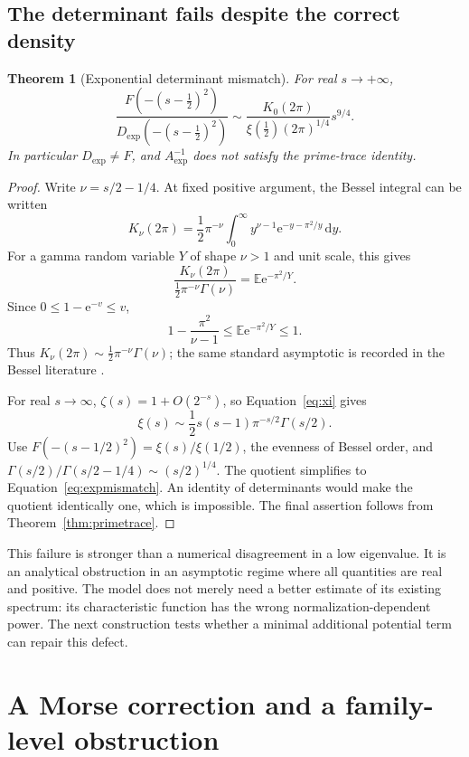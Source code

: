 \documentclass[11pt,letterpaper]{article}
\numberwithin{equation}{section}
\newtheorem{theorem}{Theorem}[section]
\theoremstyle{definition}
\theoremstyle{remark}
\newcommand{\dd}{\,\mathrm d}
\newcommand{\e}{\mathrm e}
\begin{document}
\subsection{The determinant fails despite the correct density}
\begin{theorem}[Exponential determinant mismatch]
\label{thm:expmismatch}
For real $s\to+\infty$,
\begin{equation}
 \frac{F(-(s-\tfrac12)^2)}{D_{\mathrm{exp}}(-(s-\tfrac12)^2)}
 \sim\frac{K_0(2\pi)}{\xi(\tfrac12)(2\pi)^{1/4}}s^{9/4}.
 \label{eq:expmismatch}
\end{equation}
In particular $D_{\mathrm{exp}}\neq F$, and $A_{\mathrm{exp}}^{-1}$ does not satisfy the prime-trace identity.
\end{theorem}
\begin{proof}
Write $\nu=s/2-1/4$. At fixed positive argument, the Bessel integral can be written
\[
 K_\nu(2\pi)=\frac12\pi^{-\nu}
 \int_0^\infty y^{\nu-1}\e^{-y-\pi^2/y}\dd y.
\]
For a gamma random variable $Y$ of shape $\nu>1$ and unit scale, this gives
\[
 \frac{K_\nu(2\pi)}{\frac12\pi^{-\nu}\Gamma(\nu)}
 =\mathbb E\e^{-\pi^2/Y}.
\]
Since $0\leq1-\e^{-v}\leq v$,
\begin{equation}
 1-\frac{\pi^2}{\nu-1}
 \leq\mathbb E\e^{-\pi^2/Y}\leq1.
 \label{eq:besselbound}
\end{equation}
Thus $K_\nu(2\pi)\sim\frac12\pi^{-\nu}\Gamma(\nu)$; the same standard asymptotic is recorded in the Bessel literature \cite{dlmf}.

For real $s\to\infty$, $\zeta(s)=1+O(2^{-s})$, so Equation~\eqref{eq:xi} gives
\[
 \xi(s)\sim\frac12s(s-1)\pi^{-s/2}\Gamma(s/2).
\]
Use $F(-(s-1/2)^2)=\xi(s)/\xi(1/2)$, the evenness of Bessel order, and
$\Gamma(s/2)/\Gamma(s/2-1/4)\sim(s/2)^{1/4}$. The quotient simplifies to Equation~\eqref{eq:expmismatch}. An identity of determinants would make the quotient identically one, which is impossible. The final assertion follows from Theorem~\ref{thm:primetrace}.
\end{proof}

This failure is stronger than a numerical disagreement in a low eigenvalue. It is an analytical obstruction in an asymptotic regime where all quantities are real and positive. The model does not merely need a better estimate of its existing spectrum: its characteristic function has the wrong normalization-dependent power. The next construction tests whether a minimal additional potential term can repair this defect.

\section{A Morse correction and a family-level obstruction}
\label{sec:morse}
\end{document}
